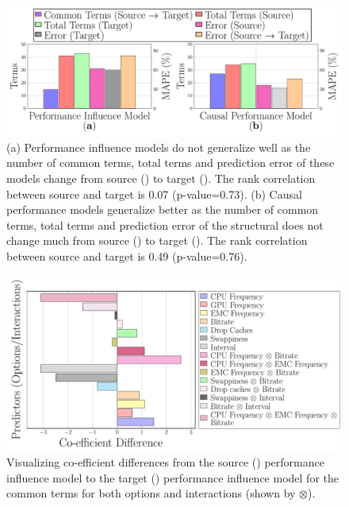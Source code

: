 \begin{figure}[tp!]
\small
    \centering
    \includegraphics*[width=\linewidth]{figures-vg/barplot_hw_change.pdf}
    \caption{\small {(a) Performance influence models do not generalize well as the number of common terms, total terms and prediction error of these models change from source (\xavier) to target (\txtwo). The rank correlation between source and target is 0.07 (p-value=0.73).} (b) \small {Causal performance models generalize better as the number of common terms, total terms and prediction error of the structural does not change much from source (\xavier) to target (\txtwo). The rank correlation between source and target is 0.49 (p-value=0.76).}}
    \label{fig:barplot_hw_change}
\end{figure}

\begin{figure}[tp!]
\small
    \centering
    \includegraphics*[width=\linewidth]{figures-vg/coeff_diff.pdf}
    \caption{\small {Visualizing co-efficient differences from the source (\xavier) performance influence model to the target (\txtwo) performance influence model for the common terms for both options and interactions (shown by $\otimes$). }}
    \label{fig:coeff_across_environments}
    
\end{figure}




